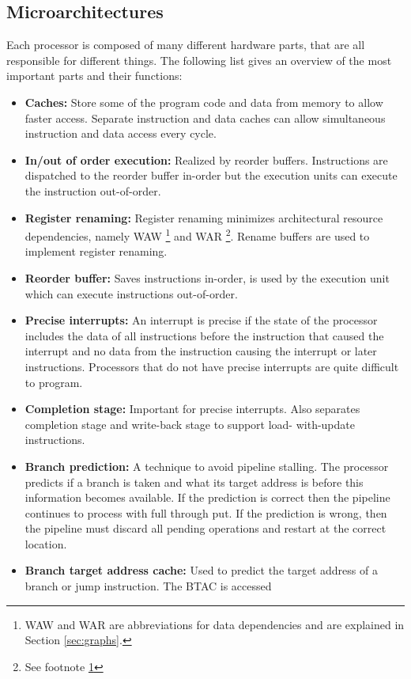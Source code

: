 \documentclass[a4paper,10pt]{article}
\begin{document}
\subsection{Microarchitectures}
Each processor is composed of many different hardware parts, that are all responsible for different things. The following list gives an 
overview of the most important parts and their functions:
\begin{itemize}
 \item \textbf{Caches:} Store some of the program code and data from memory to allow faster access. Separate instruction and data caches 
       can allow simultaneous instruction and data access every cycle.
 \item \textbf{In/out of order execution:} Realized by reorder buffers. Instructions are dispatched to the reorder buffer in-order but 
       the execution units can execute the instruction out-of-order.
 \item \textbf{Register renaming:} Register renaming minimizes architectural resource dependencies, namely WAW
       \footnote{\label{footnote-waw}WAW and WAR are abbreviations for data dependencies and are explained in Section \ref{sec:graphs}.} 
       and WAR
       \footnote{See footnote \ref{footnote-waw}}. Rename buffers are used to implement register renaming.
 \item \textbf{Reorder buffer:} Saves instructions in-order, is used by the execution unit which can execute instructions out-of-order.
 \item \textbf{Precise interrupts:} An interrupt is precise if the state of the processor includes the data of all instructions before 
       the instruction that caused the interrupt and no data from the instruction causing the interrupt or later instructions. Processors 
       that do not have precise interrupts are quite difficult to program.
 \item \textbf{Completion stage:} Important for precise interrupts. Also separates completion stage and write-back stage to support load-
       with-update instructions.
 \item \textbf{Branch prediction:} A technique to avoid pipeline stalling. The processor predicts if a branch is taken and what its 
       target address is before this information becomes available. If the prediction is correct then the pipeline continues to process 
       with full through put. If the prediction is wrong, then the pipeline must discard all pending operations and restart at the 
       correct location.
 \item \textbf{Branch target address cache:} Used to predict the target address of a branch or jump instruction. The BTAC is accessed 

\end{itemize}
\end{document}
